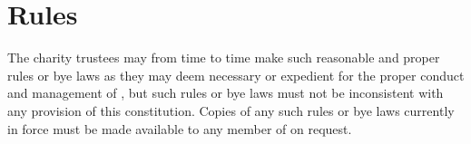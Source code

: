 \section{Rules}\label{sec:rules}
The charity trustees may from time to time make such reasonable and proper rules or bye laws as they may deem necessary or expedient for the proper conduct and management of \shortname{}, but such rules or bye laws must not be inconsistent with any provision of this constitution. Copies of any such rules or bye laws currently in force must be made available to any member of \shortname{} on request.
